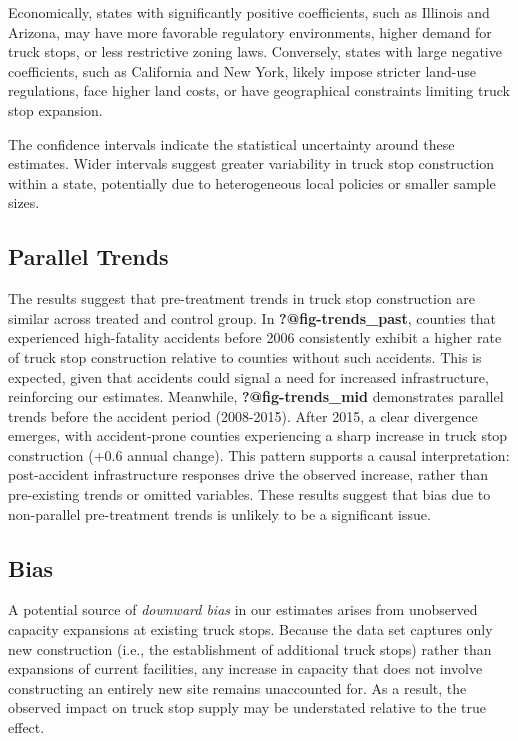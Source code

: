 \documentclass[
  12pt]{article}
\begin{document}
Economically, states with significantly positive coefficients, such as
Illinois and Arizona, may have more favorable regulatory environments,
higher demand for truck stops, or less restrictive zoning laws.
Conversely, states with large negative coefficients, such as California
and New York, likely impose stricter land-use regulations, face higher
land costs, or have geographical constraints limiting truck stop
expansion.

The confidence intervals indicate the statistical uncertainty around
these estimates. Wider intervals suggest greater variability in truck
stop construction within a state, potentially due to heterogeneous local
policies or smaller sample sizes.

\subsection{Parallel Trends}\label{parallel-trends}

The results suggest that pre-treatment trends in truck stop construction
are similar across treated and control group. In
\textbf{?@fig-trends\_past}, counties that experienced high-fatality
accidents before 2006 consistently exhibit a higher rate of truck stop
construction relative to counties without such accidents. This is
expected, given that accidents could signal a need for increased
infrastructure, reinforcing our estimates. Meanwhile,
\textbf{?@fig-trends\_mid} demonstrates parallel trends before the
accident period (2008-2015). After 2015, a clear divergence emerges,
with accident-prone counties experiencing a sharp increase in truck stop
construction (+0.6 annual change). This pattern supports a causal
interpretation: post-accident infrastructure responses drive the
observed increase, rather than pre-existing trends or omitted variables.
These results suggest that bias due to non-parallel pre-treatment trends
is unlikely to be a significant issue.

\subsection{Bias}\label{bias}

A potential source of \emph{downward bias} in our estimates arises from
unobserved capacity expansions at existing truck stops. Because the data
set captures only new construction (i.e., the establishment of
additional truck stops) rather than expansions of current facilities,
any increase in capacity that does not involve constructing an entirely
new site remains unaccounted for. As a result, the observed impact on
truck stop supply may be understated relative to the true effect.
\end{document}
